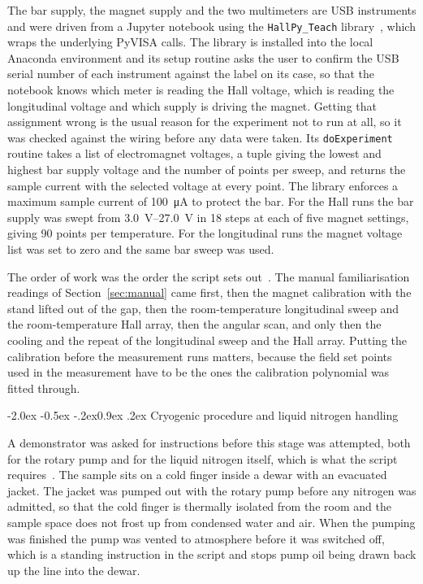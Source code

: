 \documentclass[11pt,a4paper]{article}
\makeatletter
\renewcommand\subsection{\@startsection{subsection}{2}{\z@}%
  {-2.0ex \@plus -0.5ex \@minus -.2ex}{0.9ex \@plus .2ex}%
  {\normalfont\normalsize\bfseries}}
\makeatother
\begin{document}
The bar supply, the magnet supply and the two multimeters are USB instruments and were
driven from a Jupyter notebook using the \texttt{HallPy\_Teach} library~\cite{hallpy}, which
wraps the underlying PyVISA calls. The library is installed into the local Anaconda
environment and its setup routine asks the user to confirm the USB serial number of each
instrument against the label on its case, so that the notebook knows which meter is reading
the Hall voltage, which is reading the longitudinal voltage and which supply is driving the
magnet. Getting that assignment wrong is the usual reason for the experiment not to run at
all, so it was checked against the wiring before any data were taken. Its
\texttt{doExperiment} routine takes a list of
electromagnet voltages, a tuple giving the lowest and highest bar supply voltage and the
number of points per sweep, and returns the sample current with the selected voltage at
every point. The library enforces a maximum sample current of \qty{100}{\micro\ampere} to
protect the bar. For the Hall runs the bar supply was swept from \qtyrange{3.0}{27.0}{\volt}
in \num{18} steps at each of five magnet settings, giving \num{90} points per temperature.
For the longitudinal runs the magnet voltage list was set to zero and the same bar sweep was
used.

The order of work was the order the script sets out~\cite{script}. The manual familiarisation
readings of Section~\ref{sec:manual} came first, then the magnet calibration with the stand
lifted out of the gap, then the room-temperature longitudinal sweep and the room-temperature
Hall array, then the angular scan, and only then the cooling and the repeat of the
longitudinal sweep and the Hall array. Putting the calibration before the measurement runs
matters, because the field set points used in the measurement have to be the ones the
calibration polynomial was fitted through.

\subsection{Cryogenic procedure and liquid nitrogen handling}
\label{sec:cryo}

A demonstrator was asked for instructions before this stage was attempted, both for the rotary
pump and for the liquid nitrogen itself, which is what the script requires~\cite{script}. The
sample sits on a cold finger inside a dewar with an evacuated jacket. The jacket was pumped
out with the rotary pump before any nitrogen was admitted, so that the cold finger is
thermally isolated from the room and the sample space does not frost up from condensed water
and air. When the pumping was finished the pump was vented to atmosphere before it was
switched off, which is a standing instruction in the script and stops pump oil being drawn
back up the line into the dewar.
\end{document}
